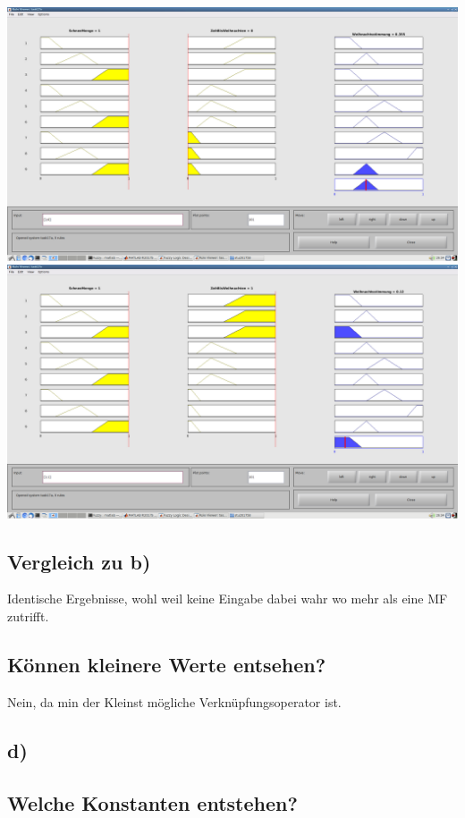 \includegraphics[width=\textwidth]{part/screenshots/fuzzy-17c-K08-1-0}
\includegraphics[width=\textwidth]{part/screenshots/fuzzy-17c-K08-1-1}

\subsection*{Vergleich zu b)}

Identische Ergebnisse, wohl weil keine Eingabe dabei wahr wo mehr als eine MF zutrifft.

\subsection*{Können kleinere Werte entsehen?}
Nein, da min der Kleinst mögliche Verknüpfungsoperator ist.

\subsection*{d)}

\subsection*{Welche Konstanten entstehen?}


